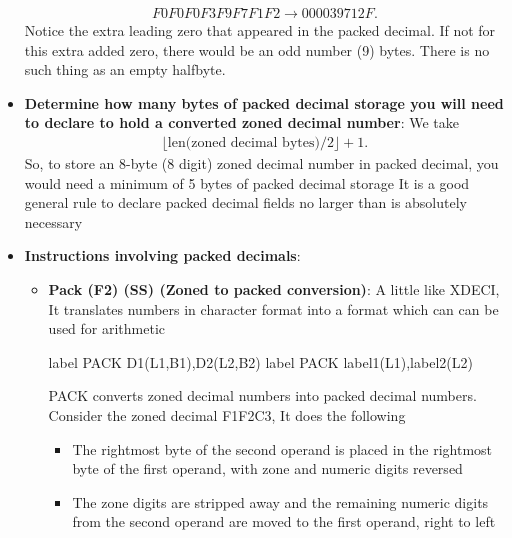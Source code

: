 \documentclass{report}
\begin{document}
\begin{itemize}
            \begin{align*}
                F0F0F0F3F9F7F1F2 \to 000039712F
            .\end{align*}
            \bigbreak \noindent 
            Notice the extra leading zero that appeared in the packed decimal. If not for this extra added zero, there would be an odd number (9) bytes. There is no such thing as an empty halfbyte.
        \item \textbf{Determine how many bytes of packed decimal storage you will need to declare to hold a converted zoned decimal number}: We take
            \begin{align*}
                \lfloor\text{len(zoned decimal bytes)}/2\rfloor + 1
            .\end{align*}
            \bigbreak \noindent 
            So, to store an 8-byte (8 digit) zoned decimal number in packed decimal, you would need a minimum of 5 bytes of packed decimal storage
            \bigbreak \noindent 
            It is a good general rule to declare packed decimal fields no larger than is absolutely necessary
        \item \textbf{Instructions involving packed decimals}:
            \begin{itemize}
                \item \textbf{Pack (F2) (SS) (Zoned to packed conversion)}: A little like XDECI, It translates numbers in character format into a format which can can be used for arithmetic
                    \bigbreak \noindent 
                    \begin{cppcode}
                        label PACK D1(L1,B1),D2(L2,B2)
                        label PACK label1(L1),label2(L2)
                    \end{cppcode}
                    \bigbreak \noindent 
                    PACK converts zoned decimal numbers into packed decimal numbers. Consider the zoned decimal F1F2C3, It does the following  
                    \begin{itemize}
                        \item The rightmost byte of the second operand is placed in the rightmost byte of the first operand, with zone and numeric digits reversed
                        \item The zone digits are stripped away and the remaining numeric digits from the second operand are moved to the first operand, right to left
                    \end{itemize}
                    \bigbreak \noindent 

\end{itemize}
\end{itemize}
\end{document}
